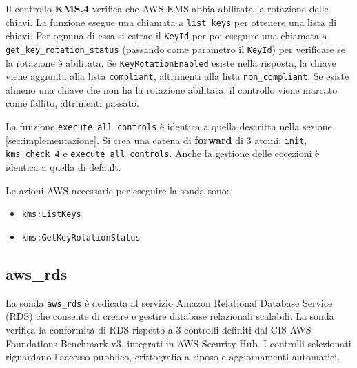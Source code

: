 Il controllo \textbf{KMS.4} verifica che AWS KMS abbia abilitata la rotazione delle chiavi. La funzione esegue una chiamata a \texttt{list\_keys} per ottenere una lista di chiavi. Per ognuna di essa si estrae il \texttt{KeyId} per poi eseguire una chiamata a \texttt{get\_key\_rotation\_status} (passando come parametro il \texttt{KeyId}) per verificare se la rotazione è abilitata. Se \texttt{KeyRotationEnabled} esiste nella risposta, la chiave viene aggiunta alla lista \texttt{compliant}, altrimenti alla lista \texttt{non\_compliant}. Se esiste almeno una chiave che non ha la rotazione abilitata, il controllo viene marcato come fallito, altrimenti passato.

La funzione \texttt{execute\_all\_controls} è identica a quella descritta nella sezione \ref{sec:implementazione}. Si crea una catena di \textbf{forward} di 3 atomi: \texttt{init}, \texttt{kms\_check\_4} e \texttt{execute\_all\_controls}. Anche la gestione delle eccezioni è identica a quella di default.

Le azioni AWS necessarie per eseguire la sonda sono:
\begin{itemize}
    \item \texttt{kms:ListKeys}
    \item \texttt{kms:GetKeyRotationStatus}
\end{itemize}

\subsection{aws\_rds}
\label{sec:rds}

La sonda \texttt{aws\_rds} è dedicata al servizio Amazon Relational Database Service (RDS) che consente di creare e gestire database relazionali scalabili. La sonda verifica la conformità di RDS rispetto a 3  controlli definiti dal CIS AWS Foundations Benchmark v3, integrati in AWS Security Hub. I controlli selezionati riguardano l'accesso pubblico, crittografia a riposo e aggiornamenti automatici.

